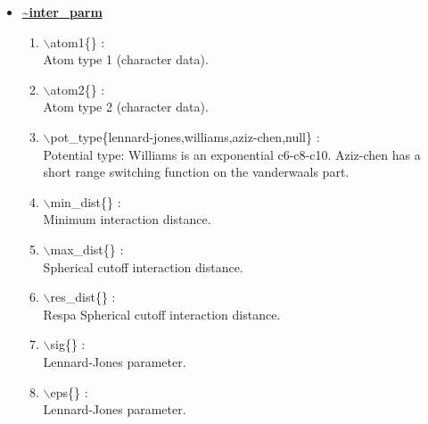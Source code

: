 \begin{itemize}

\clearpage
\huge
\item[] \underline{\bf \~{}inter\_parm}
\begin{enumerate}

 \vspace{0.15in} \Large
 \item  $\backslash$atom1\{\} : \\ 
    \large
    Atom type 1 (character data).

 \vspace{0.15in} \Large
 \item  $\backslash$atom2\{\} : \\ 
    \large
    Atom type 2 (character data).

 \vspace{0.15in} \Large
 \item  $\backslash$pot\_type\{lennard-jones,williams,aziz-chen,null\} : \\ 
    \large
    Potential type: Williams is an exponential c6-c8-c10. Aziz-chen has
    a short range switching function on the vanderwaals part.

 \vspace{0.15in} \Large
 \item  $\backslash$min\_dist\{\} : \\ 
    \large
    Minimum interaction distance.

 \vspace{0.15in} \Large
 \item  $\backslash$max\_dist\{\} : \\ 
    \large
    Spherical cutoff interaction distance.

 \vspace{0.15in} \Large
 \item  $\backslash$res\_dist\{\} : \\ 
    \large
    Respa Spherical cutoff interaction distance.

 \vspace{0.15in} \Large
 \item  $\backslash$sig\{\} : \\ 
    \large
    Lennard-Jones parameter.

 \vspace{0.15in} \Large
 \item  $\backslash$eps\{\} : \\ 
    \large
    Lennard-Jones parameter.


\end{enumerate}
\end{itemize}
